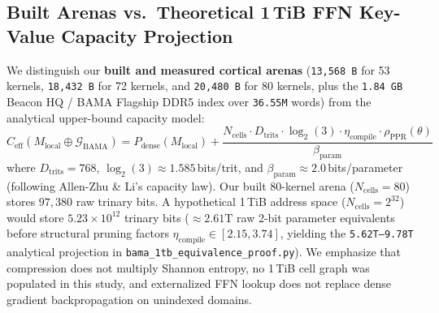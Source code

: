 \documentclass[10pt,twocolumn,letterpaper]{article}
\begin{document}
\subsection{Built Arenas vs.\ Theoretical 1\,TiB FFN Key-Value Capacity Projection}
We distinguish our \textbf{built and measured cortical arenas} (\texttt{13,568\,B} for 53 kernels, \texttt{18,432\,B} for 72 kernels, and \texttt{20,480\,B} for 80 kernels, plus the \texttt{1.84\,GB} Beacon HQ / BAMA Flagship DDR5 index over \texttt{36.55M} words) from the analytical upper-bound capacity model:
\begin{equation}
C_{\text{eff}}(M_{\text{local}} \oplus \mathcal{G}_{\text{BAMA}}) = P_{\text{dense}}(M_{\text{local}}) + \frac{N_{\text{cells}} \cdot D_{\text{trits}} \cdot \log_2(3) \cdot \eta_{\text{compile}} \cdot \rho_{\text{PPR}}(\theta)}{\beta_{\text{param}}}
\end{equation}
where $D_{\text{trits}}=768$, $\log_2(3)\approx 1.585$\,bits/trit, and $\beta_{\text{param}}\approx 2.0$\,bits/parameter (following Allen-Zhu \& Li's capacity law). Our built 80-kernel arena ($N_{\text{cells}}=80$) stores $97,380$ raw trinary bits. A hypothetical 1\,TiB address space ($N_{\text{cells}}=2^{32}$) would store $5.23\times 10^{12}$ trinary bits ($\approx 2.61\text{T}$ raw 2-bit parameter equivalents before structural pruning factors $\eta_{\text{compile}} \in [2.15, 3.74]$, yielding the \texttt{5.62T--9.78T} analytical projection in \texttt{bama\_1tb\_equivalence\_proof.py}). We emphasize that compression does not multiply Shannon entropy, no 1\,TiB cell graph was populated in this study, and externalized FFN lookup does not replace dense gradient backpropagation on unindexed domains.
\end{document}
